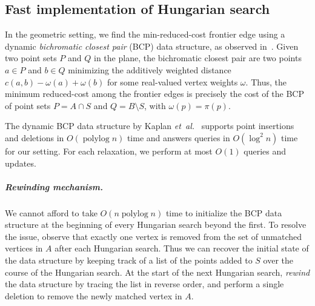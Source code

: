 \documentclass[a4paper,UKenglish]{socg-lipics-v2018}
\makeatletter
\def\note#1{\textcolor{red}{{#1}}}
\def\etal{\emph{et~al.}}
\def\etal{\textit{et~al.}}
\def\polylog{\mathop{\mathrm{polylog}}}
\theoremstyle{plain}
\numberwithin{figure}{section}
\renewcommand{\paragraph}{\subparagraph}
\def\EMPH#1{\textcolor{BrickRed}{{\emph{#1}}}}
\def\n@te#1{\textsf{\boldmath \textbf{$\langle\!\langle$#1$\rangle\!\rangle$}}\leavevmode}
\def\note#1{\textcolor{red}{\n@te{#1}}}
\makeatother
\begin{document}

\subsection{Fast implementation of Hungarian search}
\label{SS:fast-hungarian-matching}


In the geometric setting, we find the min-reduced-cost frontier edge using a dynamic
\EMPH{bichromatic closest pair} (BCP) data structure, as observed
in~\cite{AFPVX17,Vaidya89}.
Given two point sets $P$ and $Q$ in the plane, the bichromatic closest pair are two points
$a \in P$ and $b \in Q$ minimizing the additively weighted distance
$c(a, b) - \omega(a) + \omega(b)$ for some real-valued vertex weights $\omega$.
Thus, the minimum reduced-cost among the frontier edges is precisely the cost of the BCP of point sets
$P = A \cap S$ and $Q = B \setminus S$, with $\omega(p) = \pi(p)$.

The dynamic BCP data structure by Kaplan \etal~\cite{KMRSS17} supports point insertions and deletions in
$O(\polylog n)$ time and answers queries in $O(\log^2 n)$ time for our setting.
For each relaxation, we perform at most $O(1)$ queries and updates.

\paragraph{Rewinding mechanism.}
We cannot afford to take $O(n\polylog n)$ time to initialize the BCP data structure at the
beginning of every Hungarian search beyond the first.
To resolve the issue, observe that exactly one vertex is removed from the set of unmatched vertices in $A$ after each Hungarian search.
Thus we can recover the initial state of the data structure by keeping track of a list of the points added to $S$ over the course of the Hungarian search.
At the start of the next Hungarian search,
\emph{rewind} the data structure by tracing the list in reverse order, and perform a single deletion to remove the newly matched vertex in $A$.
\end{document}
